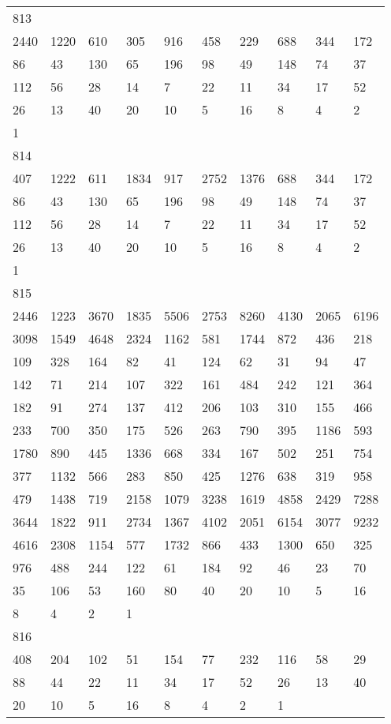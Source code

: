 \begin{longtable}{*{10}{l}}
813&&&&&&&&&\\
2440& 1220& 610& 305& 916& 458& 229& 688& 344& 172\\
86& 43& 130& 65& 196& 98& 49& 148& 74& 37\\
112& 56& 28& 14& 7& 22& 11& 34& 17& 52\\
26& 13& 40& 20& 10& 5& 16& 8& 4& 2\\
1& \\

814&&&&&&&&&\\
407& 1222& 611& 1834& 917& 2752& 1376& 688& 344& 172\\
86& 43& 130& 65& 196& 98& 49& 148& 74& 37\\
112& 56& 28& 14& 7& 22& 11& 34& 17& 52\\
26& 13& 40& 20& 10& 5& 16& 8& 4& 2\\
1& \\

815&&&&&&&&&\\
2446& 1223& 3670& 1835& 5506& 2753& 8260& 4130& 2065& 6196\\
3098& 1549& 4648& 2324& 1162& 581& 1744& 872& 436& 218\\
109& 328& 164& 82& 41& 124& 62& 31& 94& 47\\
142& 71& 214& 107& 322& 161& 484& 242& 121& 364\\
182& 91& 274& 137& 412& 206& 103& 310& 155& 466\\
233& 700& 350& 175& 526& 263& 790& 395& 1186& 593\\
1780& 890& 445& 1336& 668& 334& 167& 502& 251& 754\\
377& 1132& 566& 283& 850& 425& 1276& 638& 319& 958\\
479& 1438& 719& 2158& 1079& 3238& 1619& 4858& 2429& 7288\\
3644& 1822& 911& 2734& 1367& 4102& 2051& 6154& 3077& 9232\\
4616& 2308& 1154& 577& 1732& 866& 433& 1300& 650& 325\\
976& 488& 244& 122& 61& 184& 92& 46& 23& 70\\
35& 106& 53& 160& 80& 40& 20& 10& 5& 16\\
8& 4& 2& 1& \\

816&&&&&&&&&\\
408& 204& 102& 51& 154& 77& 232& 116& 58& 29\\
88& 44& 22& 11& 34& 17& 52& 26& 13& 40\\
20& 10& 5& 16& 8& 4& 2& 1& \\


\end{longtable}
